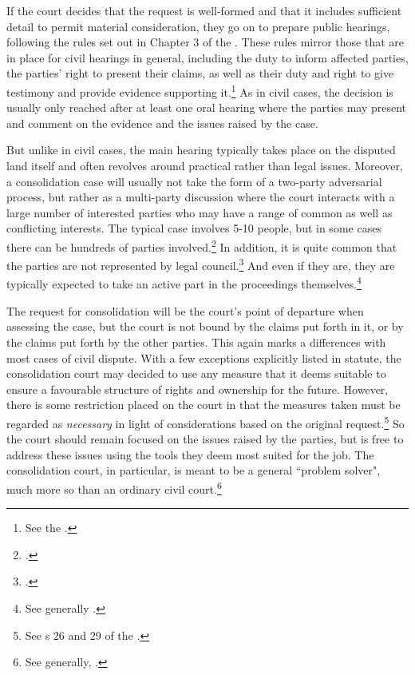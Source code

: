 If the court decides that the request is well-formed and that it includes sufficient detail to permit material consideration, they go on to prepare public hearings, following the rules set out in Chapter 3 of the \cite{lca79}. These rules mirror those that are in place for civil hearings in general, including the duty to inform affected parties, the parties' right to present their claims, as well as their duty and right to give testimony and provide evidence supporting it.\footnote{See the \cite[13|15|17 a|18]{lca79}.} As in civil cases, the decision is usually only reached after at least one oral hearing where the parties may present and comment on the evidence and the issues raised by the case. 

But unlike in civil cases, the main hearing typically takes place on the disputed land itself and often revolves around practical rather than legal issues. Moreover, a consolidation case will usually not take the form of a two-party adversarial process, but rather as a multi-party discussion where the court interacts with a large number of interested parties who may have a range of common as well as conflicting interests. The typical case involves 5-10 people, but in some cases there can be hundreds of parties involved.\footcite[39]{langbach09} In addition, it is quite common that the parties are not represented by legal council.\footcite[109-111]{rognes00} And even if they are, they are typically expected to take an active part in the proceedings themselves.\footnote{See generally \cite{rognes00}.}

The request for consolidation will be the court's point of departure when assessing the case, but the court is not bound by the claims put forth in it, or by the claims put forth by the other parties. This again marks a differences with most cases of civil dispute. With a few exceptions explicitly listed in statute, the consolidation court may decided to use any measure that it deems suitable to ensure a favourable structure of rights and ownership for the future. However, there is some restriction placed on the court in that the measures taken must be regarded as \emph{necessary} in light of considerations based on the original request.\footnote{See s 26 and 29 of the \cite{lca79}.} So the court should remain focused on the issues raised by the parties, but is free to address these issues using the tools they deem most suited for the job. The consolidation court, in particular, is meant to be a general ``problem solver", much more so than an  ordinary civil court.\footnote{See generally, \cite{rognes07}.}

